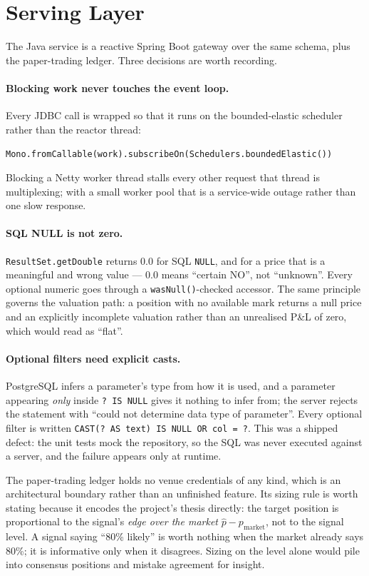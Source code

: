 \documentclass[11pt]{article}
\newcommand{\code}[1]{\texttt{\small #1}}
\begin{document}
\section{Serving Layer}
\label{sec:serving}

The Java service is a reactive Spring Boot gateway over the same schema, plus
the paper-trading ledger. Three decisions are worth recording.

\paragraph{Blocking work never touches the event loop.} Every JDBC call is
wrapped so that it runs on the bounded-elastic scheduler rather than the
reactor thread:
%
\begin{center}
\code{Mono.fromCallable(work).subscribeOn(Schedulers.boundedElastic())}
\end{center}
%
Blocking a Netty worker thread stalls every other request that thread is
multiplexing; with a small worker pool that is a service-wide outage rather
than one slow response.

\paragraph{SQL NULL is not zero.} \code{ResultSet.getDouble} returns $0.0$ for
SQL \code{NULL}, and for a price that is a meaningful and wrong value --- $0.0$
means ``certain NO'', not ``unknown''. Every optional numeric goes through a
\code{wasNull()}-checked accessor. The same principle governs the valuation
path: a position with no available mark returns a null price and an explicitly
incomplete valuation rather than an unrealised P\&L of zero, which would read as
``flat''.

\paragraph{Optional filters need explicit casts.} PostgreSQL infers a
parameter's type from how it is used, and a parameter appearing \emph{only}
inside \code{? IS NULL} gives it nothing to infer from; the server rejects the
statement with ``could not determine data type of parameter''. Every optional
filter is written \code{CAST(? AS text) IS NULL OR col = ?}. This was a shipped
defect: the unit tests mock the repository, so the SQL was never executed
against a server, and the failure appears only at runtime.

The paper-trading ledger holds no venue credentials of any kind, which is an
architectural boundary rather than an unfinished feature. Its sizing rule is
worth stating because it encodes the project's thesis directly: the target
position is proportional to the signal's \emph{edge over the market}
$\hat{p} - p_{\text{market}}$, not to the signal level. A signal saying ``80\%
likely'' is worth nothing when the market already says 80\%; it is informative
only when it disagrees. Sizing on the level alone would pile into consensus
positions and mistake agreement for insight.
\end{document}
